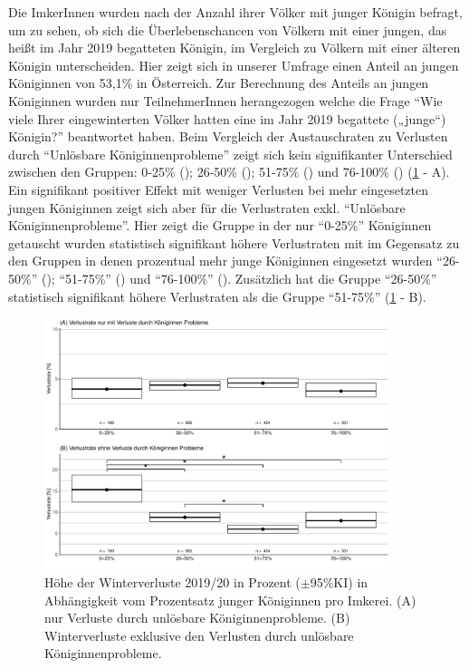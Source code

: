 \label{ss:junge_koeniginnen:U}

Die ImkerInnen wurden nach der Anzahl ihrer Völker mit junger Königin befragt, um zu sehen, ob sich die Überlebenschancen von Völkern mit einer jungen, das heißt im Jahr 2019 begatteten Königin, im Vergleich zu Völkern mit einer älteren Königin unterscheiden. Hier zeigt sich in unserer Umfrage einen Anteil an jungen Königinnen von 53,1\% in Österreich. Zur Berechnung des Anteils an jungen Königinnen wurden nur TeilnehmerInnen herangezogen welche die Frage \enquote{Wie viele Ihrer eingewinterten Völker hatten eine im Jahr 2019 begattete („junge``) Königin?} beantwortet haben.
\newline
Beim Vergleich der Austauschraten zu Verlusten durch \enquote{Unlösbare Königinnenprobleme} zeigt sich kein signifikanter Unterschied zwischen den Gruppen: 0-25\% (); 26-50\% (); 51-75\% () und 76-100\% () (\cref{fig:u:queen:exchangerate} - A).
\newline
Ein signifikant positiver Effekt mit weniger Verlusten bei mehr eingesetzten jungen Königinnen zeigt sich aber für die Verlustraten exkl. \enquote{Unlösbare Königinnenprobleme}. Hier zeigt die Gruppe in der nur \enquote{0-25\%} Königinnen getauscht wurden statistisch signifikant höhere Verlustraten mit  im Gegensatz zu den Gruppen in denen prozentual mehr junge Königinnen eingesetzt wurden \enquote{26-50\%} (); \enquote{51-75\%} () und \enquote{76-100\%} (). Zusätzlich hat die Gruppe \enquote{26-50\%} statistisch signifikant höhere Verlustraten als die Gruppe \enquote{51-75\%} (\cref{fig:u:queen:exchangerate} - B).

\begin{figure}[H]
  \centering
  \includegraphics[keepaspectratio,width=0.9\textwidth]{project-U-wintersterblichkeit/figures/plot_queen_exchangerate}
  \caption{Höhe der Winterverluste 2019/20 in Prozent ($\pm$95\%KI) in Abhängigkeit vom Prozentsatz junger Königinnen pro Imkerei. (A) nur Verluste durch unlösbare Königinnenprobleme. (B) Winterverluste exklusive den Verlusten durch unlösbare Königinnenprobleme.}
  \label{fig:u:queen:exchangerate}
\end{figure}


